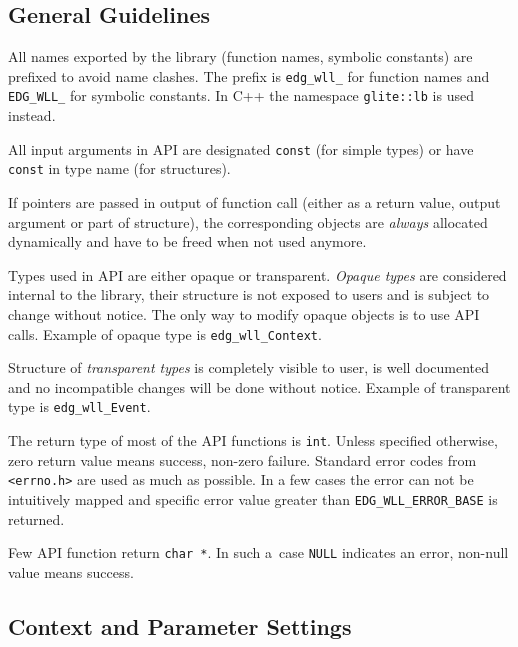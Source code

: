 \subsection{General Guidelines}

%
All names exported by the \LB library (function names, symbolic
constants) are prefixed to avoid name clashes. The prefix is
\lstinline'edg_wll_' for function names and \lstinline'EDG_WLL_' for
symbolic constants. In C++ the namespace \lstinline'glite::lb' is used
instead.

%
All input arguments in \LB API are designated \verb'const' (for simple
types) or have \verb'const' in type name (for structures).

If pointers are passed in output of function call (either as a return
value, output argument or part of structure), the corresponding
objects are \emph{always} allocated dynamically and have to be freed
when not used anymore. 

%
Types used in \LB API are either opaque or transparent. \textit{Opaque
types} are considered internal to the library, their structure is not
exposed to users and is subject to change without notice. The only way
to modify opaque objects is to use API calls. Example of opaque type
is \lstinline'edg_wll_Context'.

Structure of \textit{transparent types} is completely visible to
user, is well documented and no incompatible changes will be done
without notice. Example of transparent type is
\lstinline'edg_wll_Event'.

%
The return type of most of the API functions is \lstinline'int'.
Unless specified otherwise, zero return value means success, non-zero
failure. Standard error codes from \lstinline'<errno.h>' are used as
much as possible. In a few cases the error can not be intuitively
mapped and \LB specific error value greater than
\lstinline'EDG_WLL_ERROR_BASE' is returned.


Few API function return \lstinline'char *'. In such a~case
\lstinline'NULL' indicates an error, non-null value means success.

\subsection{Context and Parameter Settings}
\label{s:context}


